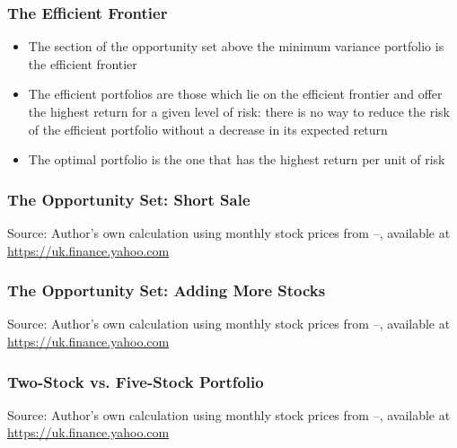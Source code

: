 \documentclass[9pt,aspectratio=169]{beamer}
\begin{document}
\begin{frame}
\frametitle{\textnormal{The Efficient Frontier}}

\begin{itemize}
    \item The section of the opportunity set above the minimum variance portfolio is the efficient frontier
\item The efficient portfolios are those which lie on the efficient frontier and offer the highest return for a given level of risk: there is no way to reduce the risk of the efficient portfolio without a decrease in its expected return
\item The optimal portfolio is the one that has the highest return per unit of risk

\end{itemize}

\end{frame}

\begin{frame}
\frametitle{\textnormal{The Opportunity Set: Short Sale}}

\begin{center}
    

    \tiny {Source: Author's own calculation using monthly stock prices from \LWindowFrom--\LWindowTo, available at \url{https://uk.finance.yahoo.com  }}

\end{center}

\end{frame}

\begin{frame}
\frametitle{\textnormal{The Opportunity Set: Adding More Stocks}}

\begin{center}
    

    \tiny {Source: Author's own calculation using monthly stock prices from \LWindowFrom--\LWindowTo, available at \url{https://uk.finance.yahoo.com  }}

\end{center}

\end{frame}

\begin{frame}
\frametitle{\textnormal{Two-Stock vs. Five-Stock Portfolio}}

\begin{center}
    

    \tiny {Source: Author's own calculation using monthly stock prices from \LWindowFrom--\LWindowTo, available at \url{https://uk.finance.yahoo.com  }}

\end{center}

\end{frame}
\end{document}
